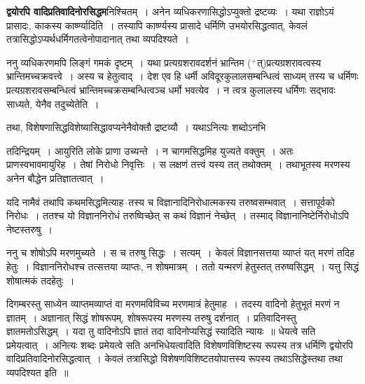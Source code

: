 \documentclass[article,12pt,a4paper]{memoir}
\newcommand{\add}[1]{($^{+}$#1)}
\begin{document}
	  \pstart \textbf{द्वयोरपि वादिप्रतिवादिनोरसिद्धम}निश्चितम् । अनेन व्यधिकरणासिद्धोऽप्युक्तो द्रष्टव्यः । यथा राज्ञोऽयं प्रासादः, काकस्य कार्ष्ण्यादिति । तस्यापि कार्ष्ण्यस्य प्रासादे धर्मिणि उभयोरसिद्धत्वात्, केवलं तत्रासिद्धोऽप्यर्थधर्मिगतत्वेनोपादानात् तथा व्यपदिश्यते ।
	\pend
      

	  \pstart ननु व्यधिकरणमपि लिङ्गं गमकं दृष्टम् । यथा प्रत्यग्रशरावदर्शनं भ्रान्तिम \add{त्}प्रत्यग्रशरावत्वस्य भ्रान्तिमच्चक्रवत्त्वे । अस्य च हेतुत्वाद् । देश एव हि धर्मी अविदूरकुलालसम्बन्धित्वं साध्यम् तस्य च धर्मिणः प्रत्यग्रशरावसम्बन्धित्वं भ्रान्तिमच्चक्रसम्बन्धित्वञ्च धर्मो भवत्येव । न त्वत्र कुलालस्य धर्मिणः सद्भावः साध्यते, येनैव तदुच्येतेति ।
	\pend
      

	  \pstart तथा, विशेषणासिद्धविशेष्यासिद्धावप्यनेनैवोक्तौ द्रष्टव्यौ । यथाऽनित्यः शब्दोऽनभि \leavevmode{} 
	  
	तदिन्द्रियम् । आयुरिति लोके प्राणा उच्यन्ते । न चागमसिद्धमिह युज्यते वक्तुम् । अतः प्राणस्वभावमायुरिह । तेषां निरोधो निवृत्तिः । स लक्षणं तत्त्वं यस्य तत् तथोक्तम् । तथाभूतस्य मरणस्य अनेन बौद्धेन प्रतिज्ञातत्वात् ।  
	  
	यदि नामैवं तथापि कथमसिद्धमित्याह--तस्य च विज्ञानादिनिरोधात्मकस्य तरुष्वसम्भवात् । सत्तापूर्वको निरोधः । ततश्च यो विज्ञाननिरोधं तरुष्विच्छेत् स कथं विज्ञानं नेच्छेत् । तस्माद् विज्ञानानिष्टेर्निरोधोऽपि नेष्टस्तरुषु ।  
	  
	ननु च शोषोऽपि मरणमुच्यते । स च तरुषु सिद्धः । सत्यम् । केवलं विज्ञानसत्तया व्याप्तं यत् मरणं तदिह हेतुः । विज्ञाननिरोधश्च तत्सत्तया व्याप्तः, न शोषमात्रम् । ततो यन्मरणं हेतुस्तत् तरुष्वसिद्धम् । यत्तु सिद्धं शोषात्मकं तदहेतुः ।  
	  
	दिगम्बरस्तु साध्येन व्याप्तमव्याप्तं वा मरणमविविच्य मरणमात्रं हेतुमाह । तदस्य वादिनो हेतुभूतं मरणं न ज्ञातम् । अज्ञानात् सिद्धं शोषरूपम्, शोषरूपस्य मरणस्य तरुषु दर्शनात् । प्रतिवादिनस्तु ज्ञातमतोऽसिद्धम् । यदा तु वादिनोऽपि ज्ञातं तदा वादिनोप्यसिद्धं स्यादिति न्यायः ॥ धेयत्वे सति प्रमेयत्वात् । अनित्यः शब्दः प्रमेयत्वे सति अनभिधेयत्वादिति विशेषणविशिष्टस्य रूपस्य तत्र धर्मिणि द्वयोरपि वादिप्रतिवादिनोरसिद्धत्वात् । केवलं तत्रासिद्धो विशेषणविशिष्टतयोपात्तस्य रूपस्य तथाऽसिद्धेस्तथा तथा व्यपदिश्यत इति ॥
	\pend
      
\end{document}
